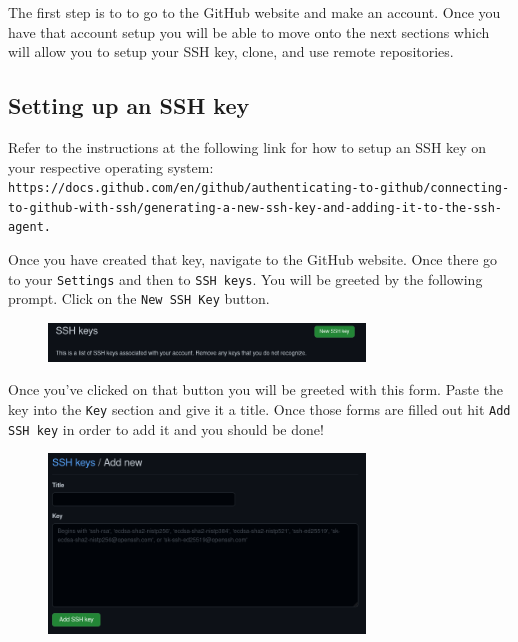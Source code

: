 \documentclass[a4paper,10pt]{article} %
\begin{document}
The first step is to to go to the GitHub website and make an account. 
Once you have that account setup you will be able to move onto 
the next sections which will allow you to setup your SSH key, clone,
and use remote repositories.

\subsection{Setting up an SSH key}

Refer to the instructions at the following link for how to setup an SSH key on
your respective operating system:
\lstinline|https://docs.github.com/en/github/authenticating-to-github/connecting-to-github-with-ssh/generating-a-new-ssh-key-and-adding-it-to-the-ssh-agent.|

%

Once you have created that key, navigate to the GitHub website. Once there go to your \lstinline|Settings| and then to \lstinline|SSH keys|. You will be greeted by the following prompt. Click on the \lstinline|New SSH Key| button.

\begin{figure}[H]
  \centering
  \includegraphics[width=0.75\textwidth]{./imgs/new_ssh.png}
\end{figure}

Once you've clicked on that button you will be greeted with this form. Paste the key into the \lstinline|Key| section and give it a title. Once those forms are filled out hit \lstinline|Add SSH key| in order to add it and you should be done!

\begin{figure}[H]
  \centering
  \includegraphics[width=0.75\textwidth]{./imgs/add_ssh.png}
\end{figure}
\end{document}
